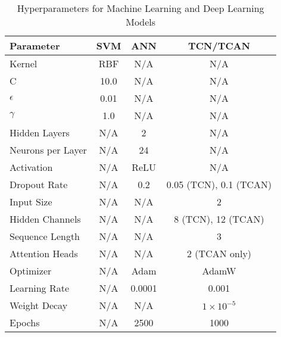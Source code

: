 \begin{table*}[ht]
\centering
\caption{Hyperparameters for Machine Learning and Deep Learning Models}
\vspace{0.5em}%
\label{tab:hyperparameters}
\begin{tabular}{|l|c|c|c|}
\hline
\textbf{Parameter} & \textbf{SVM} & \textbf{ANN} & \textbf{TCN/TCAN} \\
\hline
Kernel & RBF & N/A & N/A \\
C & 10.0 & N/A & N/A \\
$\epsilon$ & 0.01 & N/A & N/A \\
$\gamma$ & 1.0 & N/A & N/A \\
\hline
Hidden Layers & N/A & 2 & N/A \\
Neurons per Layer & N/A & 24 & N/A \\
Activation & N/A & ReLU & N/A \\
Dropout Rate & N/A & 0.2 & 0.05 (TCN), 0.1 (TCAN) \\
\hline
Input Size & N/A & N/A & 2 \\
Hidden Channels & N/A & N/A & 8 (TCN), 12 (TCAN) \\
Sequence Length & N/A & N/A & 3 \\
Attention Heads & N/A & N/A & 2 (TCAN only) \\
\hline
Optimizer & N/A & Adam & AdamW \\
Learning Rate & N/A & 0.0001 & 0.001 \\
Weight Decay & N/A & N/A & $1 \times 10^{-5}$ \\
Epochs & N/A & 2500 & 1000 \\
\hline
\end{tabular}
\end{table*}
